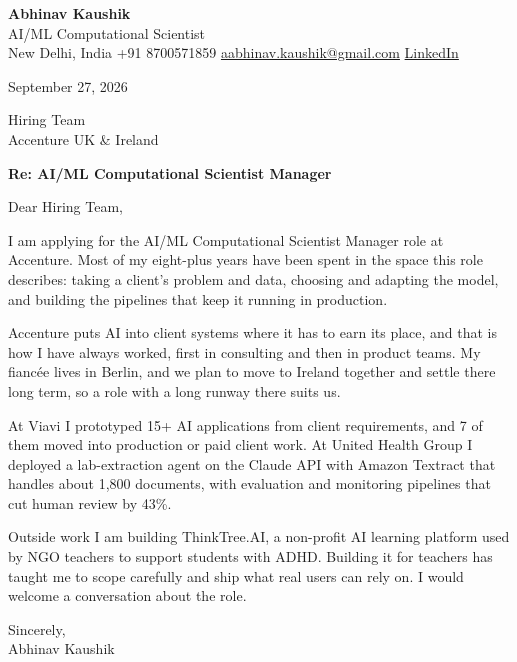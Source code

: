 \documentclass[11pt,a4paper]{article}
\begin{document}
{\Large\bfseries Abhinav Kaushik}\\
AI/ML Computational Scientist\\
New Delhi, India \textbar{} +91 8700571859 \textbar{} \href{mailto:aabhinav.kaushik@gmail.com}{aabhinav.kaushik@gmail.com} \textbar{} \href{https://www.linkedin.com/in/abhinav-kaushik10/}{LinkedIn}  

September 27, 2026

Hiring Team\\
Accenture UK \& Ireland

\textbf{Re: AI/ML Computational Scientist Manager}

Dear Hiring Team,

I am applying for the AI/ML Computational Scientist Manager role at Accenture. Most of my eight-plus years have been spent in the space this role describes: taking a client's problem and data, choosing and adapting the model, and building the pipelines that keep it running in production.

Accenture puts AI into client systems where it has to earn its place, and that is how I have always worked, first in consulting and then in product teams. My fiancée lives in Berlin, and we plan to move to Ireland together and settle there long term, so a role with a long runway there suits us.

At Viavi I prototyped 15+ AI applications from client requirements, and 7 of them moved into production or paid client work. At United Health Group I deployed a lab-extraction agent on the Claude API with Amazon Textract that handles about 1,800 documents, with evaluation and monitoring pipelines that cut human review by 43\%.

Outside work I am building ThinkTree.AI, a non-profit AI learning platform used by NGO teachers to support students with ADHD. Building it for teachers has taught me to scope carefully and ship what real users can rely on. I would welcome a conversation about the role.

Sincerely,\\[4pt]
Abhinav Kaushik
\end{document}

